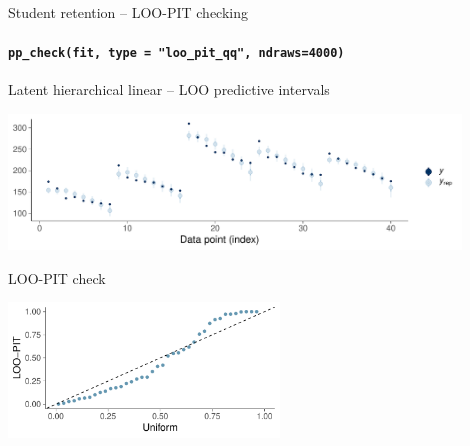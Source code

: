 \documentclass[english,t]{beamer}
\begin{document}
\begin{frame}[fragile]{Student retention -- LOO-PIT checking}
\framesubtitle{\texttt{pp\_check(fit, type = "loo\_pit\_qq", ndraws=4000)}}

\vspace{-0.5\baselineskip}  
Latent hierarchical linear -- LOO predictive intervals\\  
  \hspace{-7mm}
  \begin{minipage}[t][3.6cm][t]{1.0\linewidth}
    \includegraphics[height=3.6cm]{student_retention_lbinom_ppc_loo_intervals.pdf}
  \end{minipage}  

\vspace{-0.5\baselineskip}  
LOO-PIT check\\  
  \hspace{-7mm}
  \begin{minipage}[t][3.6cm][t]{1.0\linewidth}
    \includegraphics[height=3.6cm]{student_retention_lbinom_ppc_loo_pit_qq.pdf}
  \end{minipage}  

\end{frame}
\end{document}
